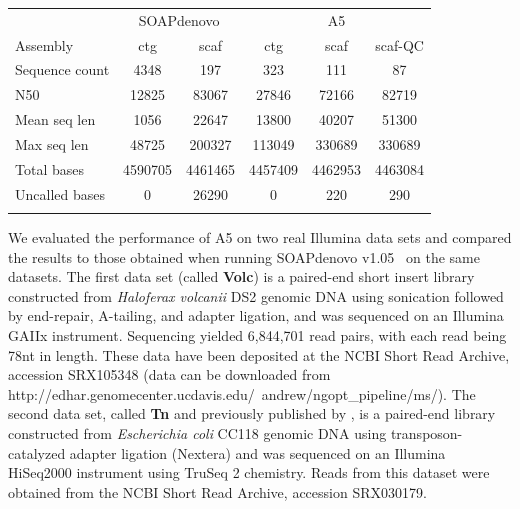 \documentclass{bioinfo}
\begin{document}

\begin{table}[!t]
{\begin{tabular}{l|cc|ccc}\toprule
& \multicolumn{2}{c|}{SOAPdenovo} & \multicolumn{3}{c}{A5} \\
Assembly        & ctg     & scaf    & ctg     & scaf    & scaf-QC \\\midrule
Sequence count  & 4348    & 197     & 323     & 111     & 87      \\
N50             & 12825   & 83067   & 27846   & 72166   & 82719   \\
Mean seq len    & 1056    & 22647   & 13800   & 40207   & 51300   \\
Max seq len     & 48725   & 200327  & 113049  & 330689  & 330689  \\
Total bases     & 4590705 & 4461465 & 4457409 & 4462953 & 4463084 \\
Uncalled bases  & 0       & 26290   & 0       & 220     & 290     \\
\botrule \\
\end{tabular}}{}
\end{table}

We evaluated the performance of A5 on two real Illumina data sets and compared the results to
those obtained when running SOAPdenovo v1.05~\citep{Li2010} on the same datasets. The first data set (called \textbf{Volc}) is a paired-end short insert library constructed from \emph{Haloferax volcanii} DS2 genomic DNA 
using sonication followed by end-repair, A-tailing, and adapter ligation, and was sequenced on an Illumina GAIIx instrument.
Sequencing yielded 6,844,701 read pairs, with each read being 78nt in length. These data have been deposited at the NCBI Short Read Archive, accession SRX105348 (data can be downloaded
from http://edhar.genomecenter.ucdavis.edu/~andrew/ngopt\_pipeline/ms/). 
The second data set, called \textbf{Tn} and previously published by \citet{Adey2010}, is a paired-end library constructed from \emph{Escherichia coli} CC118 genomic DNA
using transposon-catalyzed adapter ligation (Nextera) and was sequenced on an Illumina HiSeq2000 instrument using TruSeq 2 chemistry. 
Reads from this dataset were obtained from the NCBI Short Read Archive, accession SRX030179.
\end{document}
